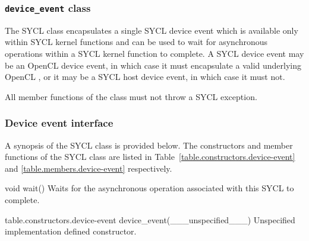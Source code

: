 \subsubsection{\texttt{device_event} class}
\label{device-event-class}

The SYCL  class encapsulates a single SYCL device event
which is available only within SYCL kernel functions and can be used to wait for
asynchronous operations within a SYCL kernel function to complete. A SYCL device
event may be an OpenCL device event, in which case it must encapsulate a valid
underlying OpenCL , or it may be a SYCL host device event,
in which case it must not.

All member functions of the  class must not throw a
SYCL exception.

\subsubsection{Device event interface}

A synopsis of the SYCL  class is provided below. The
constructors and member functions of the SYCL  class
are listed in Table~\ref{table.constructors.device-event} and
\ref{table.members.device-event} respectively.


  \addRow
    { void wait() }
    {
      Waits for the asynchronous operation associated with this SYCL
       to complete.
    }
\completeTable

{table.constructors.device-event}
  \addRow
    {device_event(___unspecified___)}
    {
      Unspecified implementation defined constructor.
    }
\completeTable

